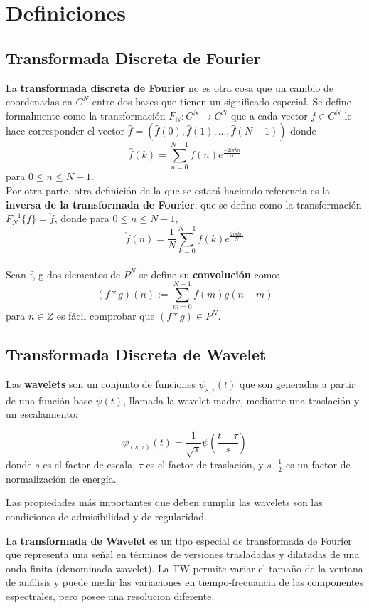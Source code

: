 \documentclass[a4paper,10pt,twocolumn]{article}
\begin{document}
\section{Definiciones}\label{sec:dev}

\subsection{Transformada Discreta de Fourier}
  La \textbf{transformada discreta de Fourier} no es otra cosa que un cambio de coordenadas en $C^N$ entre dos bases que tienen un significado especial. Se define formalmente como la transformaci\'{o}n $F_N : C^N \rightarrow C^N$ que a cada vector $f \in C^N$ le hace corresponder el vector 
$\hat{f} = (\hat{f}(0),\hat{f}(1), ..., \hat{f}(N-1))$ donde 
$$\hat{f}(k) = \sum_{n = 0}^{N-1} f(n)e ^ \frac{-2i \pi kn}{N}$$
para $0 \leq n \leq N-1$. \\

 Por otra parte, otra definici\'{o}n de la que se estará haciendo referencia es la \textbf{inversa de la transformada de Fourier}, que se define como la transformaci\'{o}n $F^{-1}_N \{ f \} = \check{f}$, donde para $0 \leq n \leq N-1$,
$$\check{f}(n) = \frac{1}{N} \sum_{k = 0}^{N-1} f(k)e ^ \frac{2i \pi kn}{N}$$\\

 Sean f, g dos elementos de $P^N$ se define su \textbf{convoluci\'{o}n} como:
$$(f * g)(n):= \sum_{m = 0}^{N-1}f(m)g(n-m)$$ para   $n \in Z$ 
es f\'{a}cil comprobar que $(f * g) \in P^N$. 

\subsection{Transformada Discreta de Wavelet}
 Las \textbf{wavelets}  son un conjunto de funciones 
${\psi_{s,\tau}(t)}$ que son generadas a partir de una función base $\psi(t)$, llamada la wavelet madre, mediante una traslación y un escalamiento:

$$\psi_{(s,\tau)}(t) = \frac{1}{\sqrt{s}}\psi\left(\displaystyle\frac{t - \tau}{s}\right)$$
donde $s$ es el factor de escala, $\tau$ es el factor de traslación, y $s^ -\frac{1}{2}$ es un factor de normalización de energía.

 Las propiedades más  importantes que deben cumplir las wavelets son las condiciones de admisibilidad y de regularidad.
 
 La \textbf{transformada de Wavelet} es un tipo especial de transformada de Fourier que representa una señal en 
términos de versiones trasladadas y dilatadas de una onda finita (denominada wavelet). La TW permite variar el tamaño de la ventana de análisis y puede medir las variaciones en tiempo-frecuancia de las componentes espectrales, pero posee una resolucion diferente.
\end{document}
